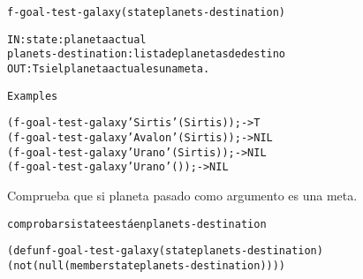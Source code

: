 \begin{aibox}{\function}
\begin{alltt}
f-goal-test-galaxy (state planets-destination) 


IN:     state: planeta actual
        planets-destination: lista de planetas de destino
OUT: T si el planeta actual es una meta.

\end{alltt}
\end{aibox}

\begin{aibox}{\examples}
\begin{alltt}
Examples

(f-goal-test-galaxy 'Sirtis '(Sirtis)) ;-> T 
(f-goal-test-galaxy 'Avalon '(Sirtis)) ;-> NIL 
(f-goal-test-galaxy 'Urano '(Sirtis)) ;-> NIL
(f-goal-test-galaxy 'Urano '()) ;-> NIL


\end{alltt}
\end{aibox}

\begin{aibox}{\comments}
Comprueba que si planeta pasado como argumento es una meta.

\end{aibox}

\begin{aibox}{\pseudocode}
\begin{alltt}

comprobar si state está en planets-destination

\end{alltt}
\end{aibox}

\begin{aibox}{\code}
\begin{alltt}
(defun f-goal-test-galaxy (state planets-destination) 
  (not (null (member state planets-destination))))




\end{alltt}
\end{aibox}
